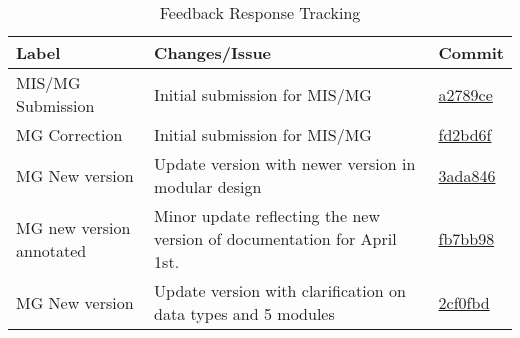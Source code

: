 \documentclass{article}
\begin{document}
\begin{table}[h]
    \centering
    \caption{Feedback Response Tracking}
    \label{tab:feedbackMGMIS}
    \begin{tabularx}{\textwidth}{|>{\raggedright\arraybackslash}p{}|>{\raggedright\arraybackslash}X|>{\raggedright\arraybackslash}p{}|}
        \hline
        \textbf{Label} & \textbf{Changes/Issue} & \textbf{Commit} \\
        \hline\hline
        MIS/MG Submission & Initial submission for MIS/MG & \href{https://github.com/UGarCil/UGarcil_capstone/commit/f35477990295cf98c539eee0f85036c674b48171}{a2789ce} \\
        \hline
        MG Correction & Initial submission for MIS/MG & \href{https://github.com/UGarCil/UGarcil_capstone/commit/fd2bd6f5b5341c89f7e1f6c776bde296b6cbc12c}{fd2bd6f} \\
        \hline
        MG New version & Update version with newer version in modular design & \href{https://github.com/UGarCil/UGarcil_capstone/commit/3ada8465952e6575a826ef02fc94bf4a8f519db8}{3ada846} \\
        \hline
        MG new version annotated & Minor update reflecting the new version of documentation for April 1st. & \href{https://github.com/UGarCil/UGarcil_capstone/commit/fb7bb98bb145bbf0a482aeb724c165c636fb190b}{fb7bb98} \\
        \hline
        MG New version & Update version with clarification on data types and 5 modules & \href{https://github.com/UGarCil/UGarcil_capstone/commit/2cf0fbde1519ea61a820182e5381c98b612500b6}{2cf0fbd} \\
        \hline
    \end{tabularx}
\end{table}

\newpage
\end{document}
